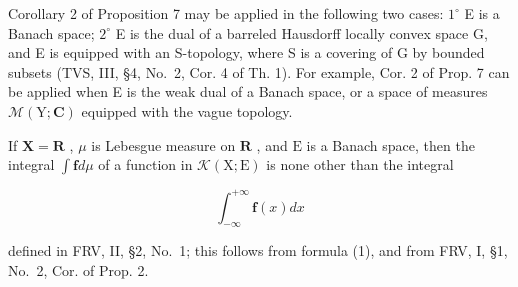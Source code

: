 Corollary 2 of Proposition 7 may be applied in the following two cases: \(1^{\circ}\) E is a Banach space; \(2^{\circ}\) E is the dual of a barreled Hausdorff locally convex space G, and E is equipped with an S-topology, where S is a covering of G by bounded subsets (TVS, III, §4, No.~2, Cor. 4 of Th. 1). For example, Cor. 2 of Prop. 7 can be applied when E is the weak dual of a Banach space, or a space of measures \(\mathcal{M}(\mathrm{Y};\mathbf{C})\) equipped with the vague topology.

If \(\mathbf{X} = \mathbf{R}\) , \(\mu\) is Lebesgue measure on \(\mathbf{R}\) , and \(\mathrm{E}\) is a Banach space, then the integral \(\int \mathbf{f} d\mu\) of a function in \(\mathcal{K}(\mathrm{X};\mathrm{E})\) is none other than the integral

\[
\int_ {- \infty} ^ {+ \infty} \mathbf {f} (x) d x
\]

defined in FRV, II, §2, No.~1; this follows from formula (1), and from FRV, I, §1, No.~2, Cor. of Prop. 2.


